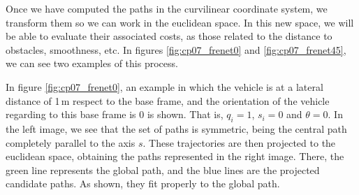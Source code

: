 Once we have computed the paths in the curvilinear coordinate system, we transform them so we can work in the euclidean space. In this new space, we will be able to evaluate their associated costs, as those related to the distance to obstacles, smoothness, etc. In figures \ref{fig:cp07_frenet0} and \ref{fig:cp07_frenet45}, we can see two examples of this process.

In figure \ref{fig:cp07_frenet0}, an example in which the vehicle is at a lateral distance of 1\,m respect to the base frame, and the orientation of the vehicle regarding to this base frame is 0 is shown. That is, $q_i = 1$, $s_i = 0$ and $\theta = 0$. In the left image, we see that the set of paths is symmetric, being the central path completely parallel to the axis $s$. These trajectories are then projected to the euclidean space, obtaining the paths represented in the right image. There, the green line represents the global path, and the blue lines are the projected candidate paths. As shown, they fit properly to the global path.

